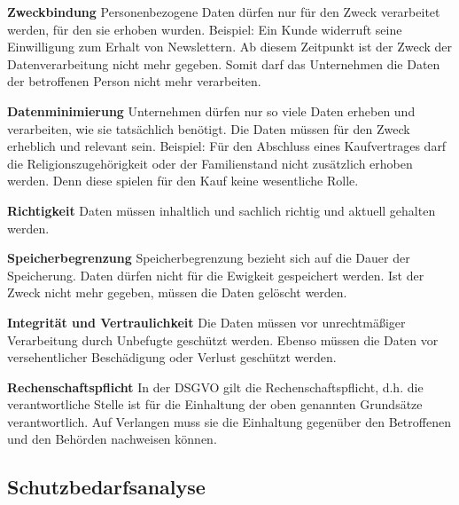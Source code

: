 \documentclass[asp1.tex]{subfiles}
\begin{document}
\textbf{Zweckbindung}
Personenbezogene Daten dürfen nur für den Zweck verarbeitet werden, für den sie erhoben wurden.
Beispiel:
Ein Kunde widerruft seine Einwilligung zum Erhalt von Newslettern. Ab diesem Zeitpunkt ist der Zweck der Datenverarbeitung nicht mehr gegeben. Somit darf das Unternehmen die Daten der betroffenen Person nicht mehr verarbeiten.

\textbf{Datenminimierung}
Unternehmen dürfen nur so viele Daten erheben und verarbeiten, wie sie tatsächlich benötigt. Die Daten müssen für den Zweck erheblich und relevant sein.
Beispiel:
Für den Abschluss eines Kaufvertrages darf die Religionszugehörigkeit oder der Familienstand nicht zusätzlich erhoben werden. Denn diese spielen für den Kauf keine wesentliche Rolle.

\textbf{Richtigkeit}
Daten müssen inhaltlich und sachlich richtig und aktuell gehalten werden.

\textbf{Speicherbegrenzung}
Speicherbegrenzung bezieht sich auf die Dauer der Speicherung. Daten dürfen nicht für die Ewigkeit gespeichert werden. Ist der Zweck nicht mehr gegeben, müssen die Daten gelöscht werden.

\textbf{Integrität und Vertraulichkeit}
Die Daten müssen vor unrechtmäßiger Verarbeitung durch Unbefugte geschützt werden. Ebenso müssen die Daten vor versehentlicher Beschädigung oder Verlust geschützt werden.

\textbf{Rechenschaftspflicht}
In der DSGVO gilt die Rechenschaftspflicht, d.h. die verantwortliche Stelle ist für die Einhaltung der oben genannten Grundsätze verantwortlich. Auf Verlangen muss sie die Einhaltung gegenüber den Betroffenen und den Behörden nachweisen können.

\subsection{Schutzbedarfsanalyse}
\end{document}
